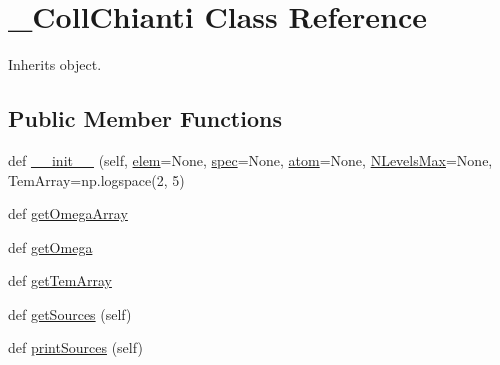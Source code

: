 \hypertarget{classpyneb_1_1utils_1_1pn__chianti_1_1___coll_chianti}{}\section{\+\_\+\+Coll\+Chianti Class Reference}
\label{classpyneb_1_1utils_1_1pn__chianti_1_1___coll_chianti}


Inherits object.

\subsection*{Public Member Functions}
\begin{DoxyCompactItemize}
\item 
def \hyperlink{classpyneb_1_1utils_1_1pn__chianti_1_1___coll_chianti_a6f5b8ef77819f33f06e45b9e7e0d94c8}{\+\_\+\+\_\+init\+\_\+\+\_\+} (self, \hyperlink{classpyneb_1_1utils_1_1pn__chianti_1_1___coll_chianti_a62e73dc66c7aff7941c5ce94e808c23a}{elem}=None, \hyperlink{classpyneb_1_1utils_1_1pn__chianti_1_1___coll_chianti_adaf1b66faf18504ec4b5c8c0b7f6763b}{spec}=None, \hyperlink{classpyneb_1_1utils_1_1pn__chianti_1_1___coll_chianti_a0c5c7091b1d8a95d9bee2744d713f5c9}{atom}=None, \hyperlink{classpyneb_1_1utils_1_1pn__chianti_1_1___coll_chianti_ab31c0831aaa2261a91f8c60c66c7eec0}{N\+Levels\+Max}=None, Tem\+Array=np.\+logspace(2, 5)
\item 
def \hyperlink{classpyneb_1_1utils_1_1pn__chianti_1_1___coll_chianti_abe866c7263d184180cefd99da4439667}{get\+Omega\+Array}
\item 
def \hyperlink{classpyneb_1_1utils_1_1pn__chianti_1_1___coll_chianti_aaf6e92dda1e6d1aa7d06098b4e9a4e6d}{get\+Omega}
\item 
def \hyperlink{classpyneb_1_1utils_1_1pn__chianti_1_1___coll_chianti_a903ccea78642f5853c9a01b1616c6899}{get\+Tem\+Array}
\item 
def \hyperlink{classpyneb_1_1utils_1_1pn__chianti_1_1___coll_chianti_ada746cff051b4eefa5f61aa4ad0e7fa6}{get\+Sources} (self)
\item 
def \hyperlink{classpyneb_1_1utils_1_1pn__chianti_1_1___coll_chianti_a8391e786a420d63ed15d4efd3f04aad5}{print\+Sources} (self)
\end{DoxyCompactItemize}
